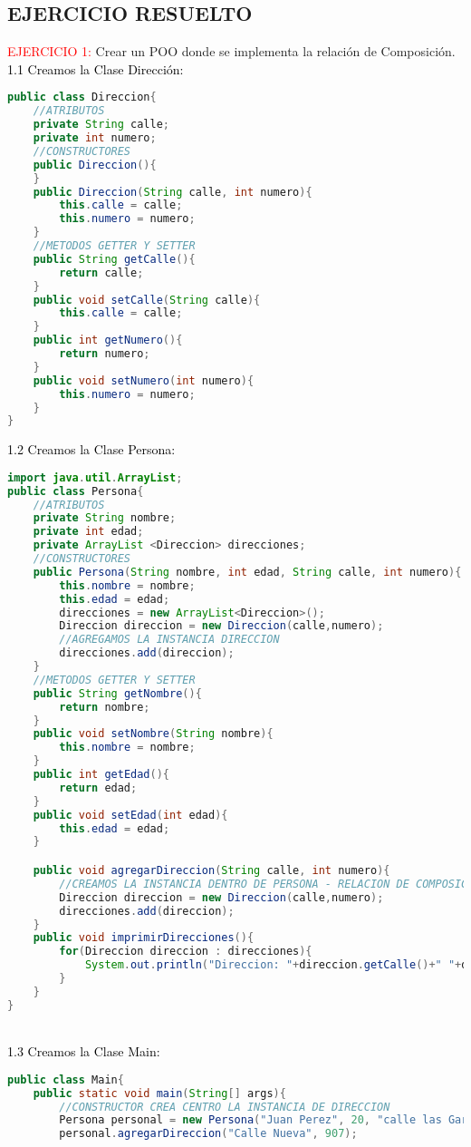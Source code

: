 \documentclass{article}
\begin{document}
\begin{itemize}
    \section{EJERCICIO RESUELTO}
	\begin{itemize}
        \textcolor{red}{EJERCICIO 1:} Crear un POO donde se implementa la relación de Composición. 
        \newline
        \\
        \textcolor{black}{1.1 Creamos la Clase Dirección:} 
		\begin{lstlisting}[language=java]
public class Direccion{
    //ATRIBUTOS
    private String calle;
    private int numero;
    //CONSTRUCTORES
    public Direccion(){
    }
    public Direccion(String calle, int numero){
        this.calle = calle;
        this.numero = numero;
    }
    //METODOS GETTER Y SETTER
    public String getCalle(){
        return calle;
    }
    public void setCalle(String calle){
        this.calle = calle;
    }
    public int getNumero(){
        return numero;
    }
    public void setNumero(int numero){
        this.numero = numero;
    }
}
        \end{lstlisting}
        \textcolor{black}{1.2 Creamos la Clase Persona:} 
		\begin{lstlisting}[language=java]
import java.util.ArrayList;
public class Persona{
    //ATRIBUTOS
    private String nombre;
    private int edad;
    private ArrayList <Direccion> direcciones;
    //CONSTRUCTORES
    public Persona(String nombre, int edad, String calle, int numero){
        this.nombre = nombre;
        this.edad = edad;
        direcciones = new ArrayList<Direccion>(); 
        Direccion direccion = new Direccion(calle,numero);
        //AGREGAMOS LA INSTANCIA DIRECCION
        direcciones.add(direccion);
    }
    //METODOS GETTER Y SETTER
    public String getNombre(){
        return nombre;
    }
    public void setNombre(String nombre){
        this.nombre = nombre;
    }
    public int getEdad(){
        return edad;
    }
    public void setEdad(int edad){
        this.edad = edad;
    }

    public void agregarDireccion(String calle, int numero){
        //CREAMOS LA INSTANCIA DENTRO DE PERSONA - RELACION DE COMPOSICION
        Direccion direccion = new Direccion(calle,numero);
        direcciones.add(direccion);
    }
    public void imprimirDirecciones(){
        for(Direccion direccion : direcciones){
            System.out.println("Direccion: "+direccion.getCalle()+" "+direccion.getNumero());
        }
    }
}
        \end{lstlisting}
        \newline
        \\
        \textcolor{black}{1.3 Creamos la Clase Main:} 
		\begin{lstlisting}[language=java]
public class Main{
    public static void main(String[] args){
        //CONSTRUCTOR CREA CENTRO LA INSTANCIA DE DIRECCION
        Persona personal = new Persona("Juan Perez", 20, "calle las Gardenias", 458);
        personal.agregarDireccion("Calle Nueva", 907);


\end{lstlisting}
\end{itemize}
\end{itemize}
\end{document}
